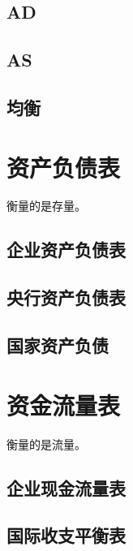 \documentclass[12pt]{book}
\begin{document}
\section{AD}

\section{AS}

\section{均衡}





\chapter{资产负债表}

衡量的是存量。

\section{企业资产负债表}



\section{央行资产负债表}

\section{国家资产负债}












\chapter{资金流量表}

衡量的是流量。




\section{企业现金流量表}



\section{国际收支平衡表}
\end{document}
